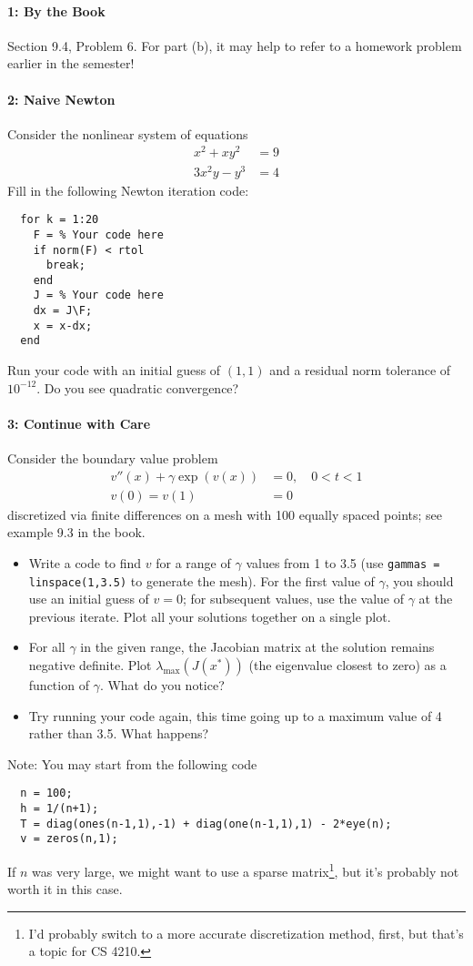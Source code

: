 \documentclass[12pt, leqno]{article}
\begin{document}

\paragraph*{1: By the Book}
Section 9.4, Problem 6.  For part (b), it may help to refer to
a homework problem earlier in the semester!

\paragraph*{2: Naive Newton}
Consider the nonlinear system of equations
\begin{align*}
  x^2 + xy^2 &= 9 \\
  3x^2y - y^3 &= 4
\end{align*}
Fill in the following Newton iteration code:
\begin{lstlisting}
  for k = 1:20
    F = % Your code here
    if norm(F) < rtol
      break;
    end
    J = % Your code here
    dx = J\F;
    x = x-dx;
  end
\end{lstlisting}
Run your code with an initial guess of $(1,1)$ and a residual norm
tolerance of $10^{-12}$.  Do you see quadratic convergence?

\paragraph*{3: Continue with Care}
Consider the boundary value problem
\begin{align*}
  v''(x) + \gamma \exp(v(x)) &= 0, \quad 0 < t < 1 \\
  v(0) = v(1) &= 0
\end{align*}
discretized via finite differences on a mesh with 100 equally spaced
points; see example 9.3 in the book.
\begin{itemize}
\item
  Write a code to find $v$ for
  a range of $\gamma$ values from 1 to 3.5 (use
  {\tt gammas = linspace(1,3.5)} to generate the mesh).  For the first
  value of $\gamma$, you should use an initial guess of $v = 0$;
  for subsequent values, use the value of $\gamma$ at the previous
  iterate.  Plot all your solutions together on a single plot.
\item
  For all $\gamma$ in the given range, the Jacobian matrix at the
  solution remains negative definite.  Plot
  $\lambda_{\max}(J(x^*))$ (the eigenvalue closest to zero) as a
  function of $\gamma$.  What do you notice?
\item
  Try running your code again, this time going up to a maximum value
  of 4 rather than 3.5.  What happens?
\end{itemize}
Note: You may start from the following code
\begin{lstlisting}
  n = 100;
  h = 1/(n+1);
  T = diag(ones(n-1,1),-1) + diag(one(n-1,1),1) - 2*eye(n);
  v = zeros(n,1);
\end{lstlisting}
If $n$ was very large, we might want to use a sparse matrix\footnote{%
I'd probably switch to a more accurate discretization method, first,
but that's a topic for CS 4210.
}, but it's probably not worth it in this case.
\end{document}
